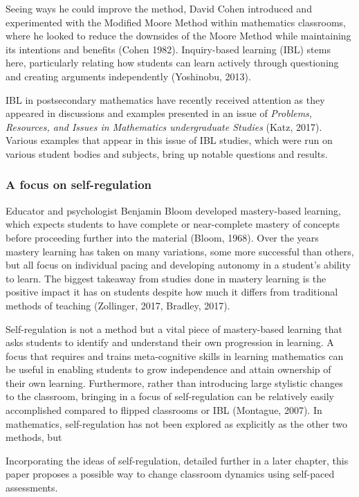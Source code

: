Seeing ways he could improve the method, David Cohen introduced and experimented with the Modified Moore Method within mathematics classrooms, where he looked to reduce the downsides of the Moore Method while maintaining its intentions and benefits (Cohen 1982). Inquiry-based learning (IBL) stems here, particularly relating how students can learn actively through questioning and creating arguments independently (Yoshinobu, 2013).

IBL in postsecondary mathematics have recently received attention as they appeared in discussions and examples presented in an issue of {\it Problems, Resources, and Issues in Mathematics undergraduate Studies} (Katz, 2017). Various examples that appear in this issue of IBL studies, which were run on various student bodies and subjects, bring up notable questions and results.

\subsubsection{A focus on self-regulation}
Educator and psychologist Benjamin Bloom developed mastery-based learning, which expects students to have complete or near-complete mastery of concepts before proceeding further into the material (Bloom, 1968). Over the years mastery learning has taken on many variations, some more successful than others, but all focus on individual pacing and developing autonomy in a student's ability to learn. The biggest takeaway from studies done in mastery learning is the positive impact it has on students despite how much it differs from traditional methods of teaching (Zollinger, 2017, Bradley, 2017).

Self-regulation is not a method but a vital piece of mastery-based learning that asks students to identify and understand their own progression in learning. A focus that requires and trains meta-cognitive skills in learning mathematics can be useful in enabling students to grow independence and attain ownership of their own learning. Furthermore, rather than introducing large stylistic changes to the classroom, bringing in a focus of self-regulation can be relatively easily accomplished compared to flipped classrooms or IBL (Montague, 2007). In mathematics, self-regulation has not been explored as explicitly as the other two methods, but

Incorporating the ideas of self-regulation, detailed further in a later chapter, this paper proposes a possible way to change classroom dynamics using self-paced assessments.

